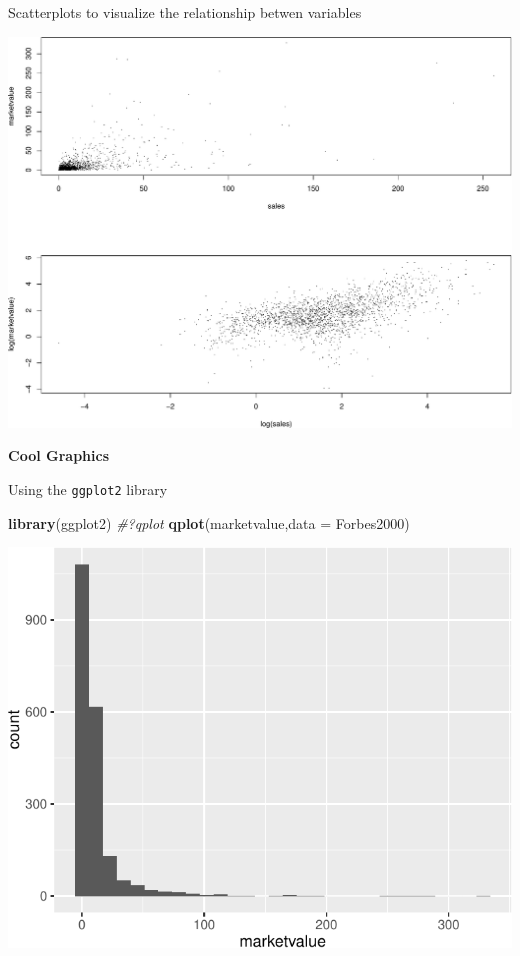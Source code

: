 \documentclass[]{article}
\newenvironment{Shaded}{\begin{snugshade}}{\end{snugshade}}
\newcommand{\KeywordTok}[1]{\textcolor[rgb]{0.13,0.29,0.53}{\textbf{{#1}}}}
\newcommand{\DataTypeTok}[1]{\textcolor[rgb]{0.13,0.29,0.53}{{#1}}}
\newcommand{\CommentTok}[1]{\textcolor[rgb]{0.56,0.35,0.01}{\textit{{#1}}}}
\newcommand{\NormalTok}[1]{{#1}}
\numberwithin{equation}{section}
\begin{document}
Scatterplots to visualize the relationship betwen variables

\includegraphics{tema1_files/figure-latex/unnamed-chunk-151-1.pdf}

\textbf{Cool Graphics}

Using the \texttt{ggplot2} library

\begin{Shaded}
\begin{Highlighting}[]
\KeywordTok{library}\NormalTok{(ggplot2)}
\CommentTok{#?qplot}
\KeywordTok{qplot}\NormalTok{(marketvalue,}\DataTypeTok{data =} \NormalTok{Forbes2000)}
\end{Highlighting}
\end{Shaded}

\includegraphics{tema1_files/figure-latex/unnamed-chunk-152-1.pdf}
\end{document}
